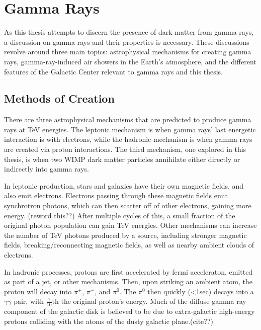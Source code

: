\cleartooddpage[\thispagestyle{empty}]
\chapter{Gamma Rays}

As this thesis attempts to discern the presence of dark matter from gamma rays, a discussion on gamma rays and their properties is necessary.
These discussions revolve around three main topics: astrophysical mechanisms for creating gamma rays, gamma-ray-induced air showers in the Earth's atmosphere, and the different features of the Galactic Center relevant to gamma rays and this thesis.


\section{Methods of Creation}

There are three astrophysical mechanisms that are predicted to produce gamma rays at TeV energies.
The leptonic mechanism is when gamma rays' last energetic interaction is with electrons, while the hadronic mechanism is when gamma rays are created via proton interactions.
The third mechanism, one explored in this thesis, is when two WIMP dark matter particles annihilate either directly or indirectly into gamma rays.

In leptonic production, stars and galaxies have their own magnetic fields, and also emit electrons.
Electrons passing through these magnetic fields emit synchrotron photons, which can then scatter off of other electrons, gaining more energy. (reword this??)
After multiple cycles of this, a small fraction of the original photon population can gain TeV energies.
Other mechanisms can increase the number of TeV photons produced by a source, including stronger magnetic fields, breaking/reconnecting magnetic fields, as well as nearby ambient clouds of electrons.

In hadronic processes, protons are first accelerated by fermi acceleraton, emitted as part of a jet, or other mechanisms.
Then, upon striking an ambient atom, the proton will decay into $\pi^{+}$, $\pi^{-}$, and $\pi^{0}$.
The $\pi^{0}$ then quickly (<1sec) decays into a $\gamma\gamma$ pair, with \nicetilde $\frac{1}{10}$th the original proton's energy.
Much of the diffuse gamma ray component of the galactic disk is believed to be due to extra-galactic high-energy protons colliding with the atoms of the dusty galactic plane.(cite??)


